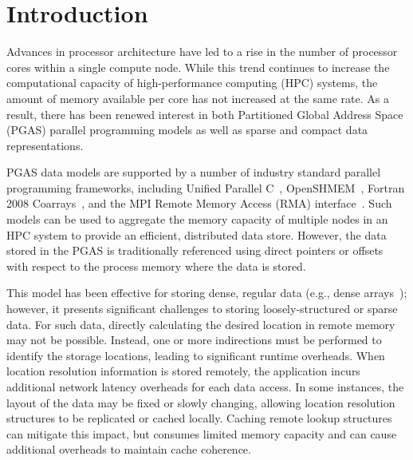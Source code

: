 \section{Introduction}

Advances in processor architecture have led to a rise in the number of
processor cores within a single compute node.  While this trend continues to
increase the computational capacity of high-performance computing (HPC)
systems, the amount of memory available per core has not increased at the same
rate.  As a result, there has been renewed interest in both Partitioned Global
Address Space (PGAS) parallel programming models as well as sparse and compact
data representations.

PGAS data models are supported by a number of industry standard parallel
programming frameworks, including Unified Parallel C~\cite{upc-13-spec},
OpenSHMEM~\cite{openshmem-1.3}, Fortran 2008 Coarrays~\cite{reid:08}, and the MPI
Remote Memory Access (RMA) interface~\cite{mpi-forum:15}.  Such models can be used
to aggregate the memory capacity of multiple nodes in an HPC system to provide
an efficient, distributed data store.  However, the data stored in the PGAS is
traditionally referenced using direct pointers or offsets with respect to the
process memory where the data is stored.

This model has been effective for storing dense, regular data (e.g.,
dense arrays~\cite{ga}); however, it presents significant challenges
to storing loosely-structured or sparse data.  For such data, directly
calculating the desired location in remote memory may not be possible.
Instead, one or more indirections must be performed to identify the
storage locations, leading to significant runtime overheads.  When
location resolution information is stored remotely, the application
incurs additional network latency overheads for each data access. In
some instances, the layout of the data may be fixed or slowly
changing, allowing location resolution structures to be replicated or
cached locally. Caching remote lookup structures can mitigate this
impact, but consumes limited memory capacity and can cause additional
overheads to maintain cache coherence.


